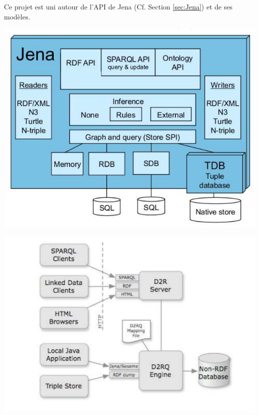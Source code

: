 \documentclass{article}
\begin{document}
Ce projet est uni autour de l'API de Jena (Cf. Section \ref{sec:Jena}) et de ses modèles.
\begin{center}
\includegraphics[scale=0.5]{archi_jena.jpeg} 
\label{fig_jena}
\end{center}

\begin{center}
\includegraphics[scale=0.5]{archi_D2RQ.jpeg} 
\label{fig_d2rq}
\end{center}
\end{document}
